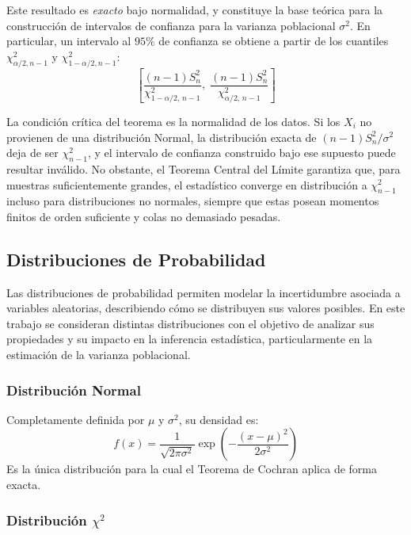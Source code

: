 \documentclass[11pt]{article}
\begin{document}
Este resultado es \textit{exacto} bajo normalidad, y constituye la base teórica 
para la construcción de intervalos de confianza para la varianza poblacional 
$\sigma^2$. En particular, un intervalo al $95\%$ de confianza se obtiene a 
partir de los cuantiles $\chi^2_{\alpha/2, n-1}$ y $\chi^2_{1-\alpha/2, n-1}$:
\begin{equation}
    \left[\frac{(n-1)S_n^2}{\chi^2_{1-\alpha/2,\, n-1}},\; 
    \frac{(n-1)S_n^2}{\chi^2_{\alpha/2,\, n-1}}\right]
\end{equation}

La condición crítica del teorema es la normalidad de los datos. Si los 
$X_i$ no provienen de una distribución Normal, la distribución exacta de 
$(n-1)S_n^2/\sigma^2$ deja de ser $\chi^2_{n-1}$, y el intervalo de confianza 
construido bajo ese supuesto puede resultar inválido. No obstante, el Teorema 
Central del Límite garantiza que, para muestras suficientemente grandes, el 
estadístico converge en distribución a $\chi^2_{n-1}$ incluso para 
distribuciones no normales, siempre que estas posean momentos finitos de orden 
suficiente y colas no demasiado pesadas.

\subsection{Distribuciones de Probabilidad}

Las distribuciones de probabilidad permiten modelar la incertidumbre asociada a variables aleatorias, describiendo cómo se distribuyen sus valores posibles. En este trabajo se consideran distintas distribuciones con el objetivo de analizar sus propiedades y su impacto en la inferencia estadística, particularmente en la estimación de la varianza poblacional.

\subsubsection{Distribución Normal}

Completamente definida por $\mu$ y $\sigma^2$, su densidad es:
\begin{equation}
f(x) = \frac{1}{\sqrt{2\pi\sigma^2}} \exp\left(-\frac{(x-\mu)^2}{2\sigma^2}\right)
\end{equation}
Es la única distribución para la cual el Teorema de Cochran aplica de forma exacta.

\subsubsection{Distribución $\chi^2$}
\end{document}
